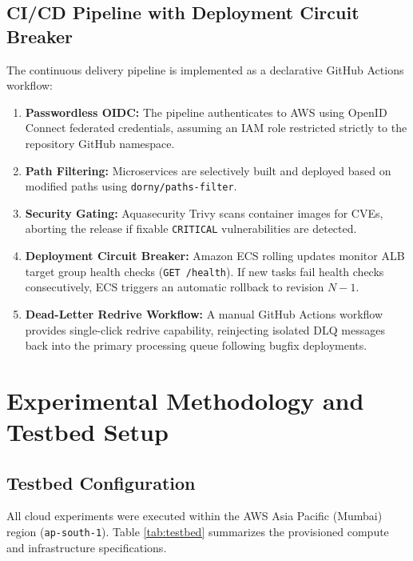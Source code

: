 \documentclass[conference]{IEEEtran}
\begin{document}
\subsection{CI/CD Pipeline with Deployment Circuit Breaker}
The continuous delivery pipeline is implemented as a declarative GitHub Actions workflow:
\begin{enumerate}
    \item \textbf{Passwordless OIDC:} The pipeline authenticates to AWS using OpenID Connect federated credentials, assuming an IAM role restricted strictly to the repository GitHub namespace.
    \item \textbf{Path Filtering:} Microservices are selectively built and deployed based on modified paths using \texttt{dorny/paths-filter}.
    \item \textbf{Security Gating:} Aquasecurity Trivy scans container images for CVEs, aborting the release if fixable \texttt{CRITICAL} vulnerabilities are detected.
    \item \textbf{Deployment Circuit Breaker:} Amazon ECS rolling updates monitor ALB target group health checks (\texttt{GET /health}). If new tasks fail health checks consecutively, ECS triggers an automatic rollback to revision $N-1$.
    \item \textbf{Dead-Letter Redrive Workflow:} A manual GitHub Actions workflow provides single-click redrive capability, reinjecting isolated DLQ messages back into the primary processing queue following bugfix deployments.
\end{enumerate}

\section{Experimental Methodology and Testbed Setup}

\subsection{Testbed Configuration}
All cloud experiments were executed within the AWS Asia Pacific (Mumbai) region (\texttt{ap-south-1}). Table \ref{tab:testbed} summarizes the provisioned compute and infrastructure specifications.
\end{document}
